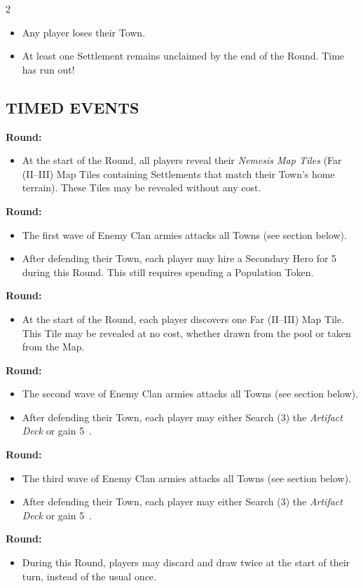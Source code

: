 \begin{multicols}{2}
\begin{itemize}
  \item Any player loses their Town.
  \item At least one Settlement remains unclaimed by the end of the  Round. Time has run out!
\end{itemize}

\subsection*{\MakeUppercase{Timed Events}}
\textbf{ Round:}
\begin{itemize}
  \item At the start of the Round, all players reveal their \textit{Nemesis Map Tiles} (Far (II--III) Map Tiles containing Settlements that match their Town's home terrain). These Tiles may be revealed without any cost.
\end{itemize}
\textbf{ Round:}
\begin{itemize}
  \item The first wave of Enemy Clan armies attacks all Towns (see section below).
  \item After defending their Town, each player may hire a Secondary Hero for 5~ during this Round. This still requires spending a Population Token.
\end{itemize}
\textbf{ Round:}
\begin{itemize}
  \item At the start of the Round, each player discovers one Far (II--III) Map Tile. This Tile may be revealed at no cost, whether drawn from the pool or taken from the Map.
\end{itemize}
\textbf{ Round:}
\begin{itemize}
  \item The second wave of Enemy Clan armies attacks all Towns (see section below).
  \item After defending their Town, each player may either Search (3) the \textit{Artifact Deck} or gain 5~.
\end{itemize}
\textbf{ Round:}
\begin{itemize}
  \item The third wave of Enemy Clan armies attacks all Towns (see section below).
  \item After defending their Town, each player may either Search (3) the \textit{Artifact Deck} or gain 5~.
\end{itemize}
\textbf{ Round:}
\begin{itemize}
  \item During this Round, players may discard and draw twice at the start of their turn, instead of the usual once.
\end{itemize}


\end{multicols}
